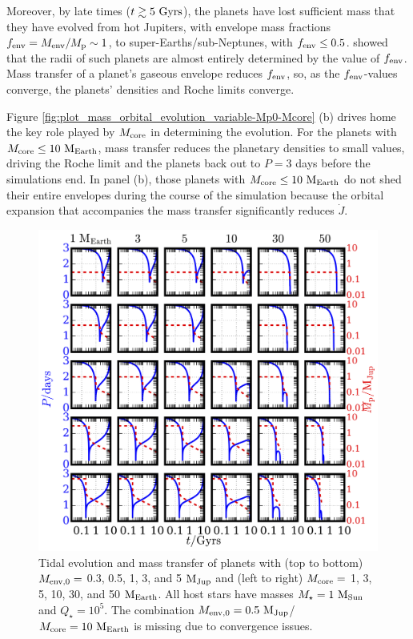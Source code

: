 \documentclass{svjour3}                     %
\providecommand{\DIFadd}[1]{{\protect\color{blue}\uwave{#1}}} %
\providecommand{\DIFdel}[1]{{\protect\color{red}\sout{#1}}}                      %
\providecommand{\DIFaddbegin}{} %
\providecommand{\DIFaddend}{} %
\providecommand{\DIFdelbegin}{} %
\providecommand{\DIFdelend}{} %
\begin{document}
Moreover, by late times ($t \gtrsim 5\ {\rm Gyrs}$), the planets have lost sufficient mass that they have evolved from hot Jupiters, with envelope mass fractions $f_{\rm env} = M_{\rm env}/M_{\rm p} \sim 1$, to super-Earths/sub-Neptunes, with $f_{\rm env} \le 0.5$. \cite{Lopez2014Understanding} showed that the radii of such planets are almost entirely determined by the value of $f_{\rm env}$. Mass transfer of a planet's gaseous envelope reduces $f_{\rm env}$, so, as the $f_{\rm env}$-values converge, the planets' densities and Roche limits converge. 

Figure \ref{fig:plot_mass_orbital_evolution_variable-Mp0-Mcore} (b) drives home the key role played by $M_{\rm core}$ in determining the evolution. For the planets with $M_{\rm core} \le 10\ {\rm M_{Earth}}$, mass transfer reduces the planetary densities to small values, driving the Roche limit and the planets back out to $P = 3$ days before the simulations end. In panel (b), those planets with $M_{\rm core} \le 10\ {\rm M_{Earth}}$ do not shed their entire envelopes during the course of the simulation because the orbital expansion that accompanies the mass transfer significantly reduces \DIFdelbegin \DIFdel{$\dot{J}$}\DIFdelend \DIFaddbegin \DIFadd{$\left( \partial J/\partial t \right)_{\rm tides}$}\DIFaddend . 

\begin{figure}
\includegraphics[width=\textwidth]{plot_mass_orbit_evolution_grid_qs5}
\caption{Tidal evolution and mass transfer of planets with (top to bottom) $M_{\rm env, 0} =$ 0.3, 0.5, 1, 3, and 5 ${\rm M_{Jup}}$ and (left to right) $M_{\rm core} =$ 1, 3, 5, 10, 30, and 50 ${\rm M_{Earth}}$. All host stars have masses $M_\star = 1\ {\rm M_{Sun}}$ and $Q_\star = 10^5$. The combination $M_{\rm env, 0} = 0.5\ {\rm M_{Jup}}$/$M_{\rm core} = 10\ {\rm M_{Earth}}$ is missing due to convergence issues.}
\label{fig:plot_mass_orbit_evolution_grid_qs5}
\end{figure}
\end{document}
